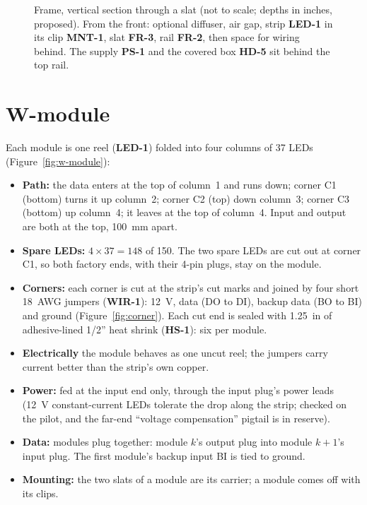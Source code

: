 \documentclass[11pt,letterpaper]{article}
\newcommand{\id}[1]{\textsf{\textbf{#1}}}  %
\begin{document}
\begin{figure}[!htbp]
  \centering
  
  \caption{Frame, vertical section through a slat (not to scale; depths in inches, proposed).  From the front:
    optional diffuser, air gap, strip \id{LED-1} in its clip \id{MNT-1}, slat \id{FR-3}, rail \id{FR-2}, then
    space for wiring behind.  The supply \id{PS-1} and the covered box \id{HD-5} sit behind the top rail.}
  \label{fig:frame-section}
\end{figure}

\section{W-module}

Each module is one reel (\id{LED-1}) folded into four columns of 37 LEDs (Figure~\ref{fig:w-module}):
\begin{itemize}
  \item \textbf{Path:} the data enters at the top of column~1 and runs down; corner C1 (bottom) turns it up
    column~2; corner C2 (top) down column~3; corner C3 (bottom) up column~4; it leaves at the top of
    column~4.  Input and output are both at the top, \SI{100}{mm} apart.
  \item \textbf{Spare LEDs:} $4 \times 37 = 148$ of 150.  The two spare LEDs are cut out at corner C1, so both
    factory ends, with their 4-pin plugs, stay on the module.
  \item \textbf{Corners:} each corner is cut at the strip's cut marks and joined by four short 18~AWG jumpers
    (\id{WIR-1}): \SI{12}{V}, data (DO to DI), backup data (BO to BI) and ground (Figure~\ref{fig:corner}).
    Each cut end is sealed with \SI{1.25}{in} of adhesive-lined 1/2'' heat shrink (\id{HS-1}): six per module.
  \item \textbf{Electrically} the module behaves as one uncut reel; the jumpers carry current better than the
    strip's own copper.
  \item \textbf{Power:} fed at the input end only, through the input plug's power leads (12~V constant-current
    LEDs tolerate the drop along the strip; checked on the pilot, and the far-end ``voltage compensation''
    pigtail is in reserve).
  \item \textbf{Data:} modules plug together: module $k$'s output plug into module $k{+}1$'s input plug.  The
    first module's backup input BI is tied to ground.
  \item \textbf{Mounting:} the two slats of a module are its carrier; a module comes off with its clips.
\end{itemize}
\end{document}

